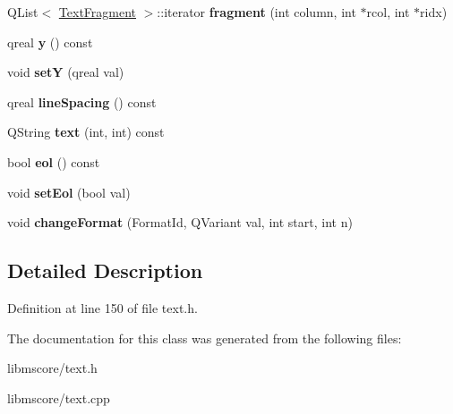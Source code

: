 \begin{DoxyCompactItemize}
Q\+List$<$ \hyperlink{class_ms_1_1_text_fragment}{Text\+Fragment} $>$\+::iterator {\bfseries fragment} (int column, int $\ast$rcol, int $\ast$ridx)
\item 
\mbox{\label{class_ms_1_1_text_block_a624c8f31d88c5b233af7f511841b88d2}} 
qreal {\bfseries y} () const
\item 
\mbox{\label{class_ms_1_1_text_block_a8078d9bd6d266eb6764663d7d58d5460}} 
void {\bfseries setY} (qreal val)
\item 
\mbox{\label{class_ms_1_1_text_block_a21b113472cef0743946858c29b286e3e}} 
qreal {\bfseries line\+Spacing} () const
\item 
\mbox{\label{class_ms_1_1_text_block_afab656a4fe2bd8e1d416b4d3a4ae601d}} 
Q\+String {\bfseries text} (int, int) const
\item 
\mbox{\label{class_ms_1_1_text_block_af4439a9981ffd3ca5c431080bde6ed79}} 
bool {\bfseries eol} () const
\item 
\mbox{\label{class_ms_1_1_text_block_ab3442cee3338033e4358956ebd904c2c}} 
void {\bfseries set\+Eol} (bool val)
\item 
\mbox{\label{class_ms_1_1_text_block_ac191344dc66df852f14781a6f4e3a93f}} 
void {\bfseries change\+Format} (Format\+Id, Q\+Variant val, int start, int n)
\end{DoxyCompactItemize}


\subsection{Detailed Description}


Definition at line 150 of file text.\+h.



The documentation for this class was generated from the following files\+:\begin{DoxyCompactItemize}
\item 
libmscore/text.\+h\item 
libmscore/text.\+cpp\end{DoxyCompactItemize}
